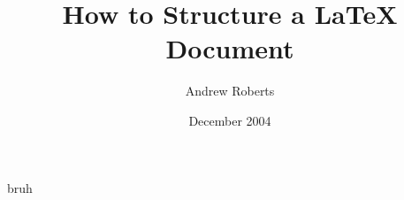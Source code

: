 \documentclass{resume}
\begin{document}
\title{How to Structure a LaTeX Document}
\author{Andrew Roberts}
\date{December 2004}
\maketitle
bruh
\end{document}
